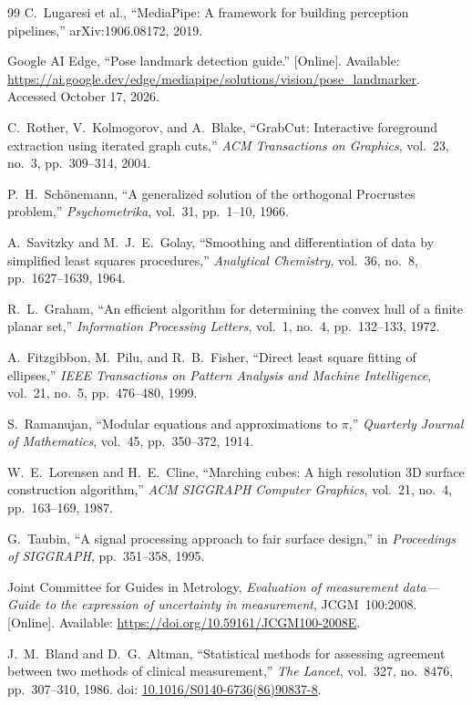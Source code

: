 \documentclass[11pt,a4paper]{article}
\begin{document}
\begin{thebibliography}{99}
C.~Lugaresi et al., ``MediaPipe: A framework for building perception pipelines,'' arXiv:1906.08172, 2019.

Google AI Edge, ``Pose landmark detection guide.'' [Online]. Available: \url{https://ai.google.dev/edge/mediapipe/solutions/vision/pose_landmarker}. Accessed October 17, 2026.

C.~Rother, V.~Kolmogorov, and A.~Blake, ``GrabCut: Interactive foreground extraction using iterated graph cuts,'' \emph{ACM Transactions on Graphics}, vol.~23, no.~3, pp.~309--314, 2004.

P.~H.~Sch\"onemann, ``A generalized solution of the orthogonal Procrustes problem,'' \emph{Psychometrika}, vol.~31, pp.~1--10, 1966.

A.~Savitzky and M.~J.~E.~Golay, ``Smoothing and differentiation of data by simplified least squares procedures,'' \emph{Analytical Chemistry}, vol.~36, no.~8, pp.~1627--1639, 1964.

R.~L.~Graham, ``An efficient algorithm for determining the convex hull of a finite planar set,'' \emph{Information Processing Letters}, vol.~1, no.~4, pp.~132--133, 1972.

A.~Fitzgibbon, M.~Pilu, and R.~B.~Fisher, ``Direct least square fitting of ellipses,'' \emph{IEEE Transactions on Pattern Analysis and Machine Intelligence}, vol.~21, no.~5, pp.~476--480, 1999.

S.~Ramanujan, ``Modular equations and approximations to $\pi$,'' \emph{Quarterly Journal of Mathematics}, vol.~45, pp.~350--372, 1914.

W.~E.~Lorensen and H.~E.~Cline, ``Marching cubes: A high resolution 3D surface construction algorithm,'' \emph{ACM SIGGRAPH Computer Graphics}, vol.~21, no.~4, pp.~163--169, 1987.

G.~Taubin, ``A signal processing approach to fair surface design,'' in \emph{Proceedings of SIGGRAPH}, pp.~351--358, 1995.

Joint Committee for Guides in Metrology, \emph{Evaluation of measurement data---Guide to the expression of uncertainty in measurement}, JCGM~100:2008. [Online]. Available: \url{https://doi.org/10.59161/JCGM100-2008E}.

J.~M.~Bland and D.~G.~Altman, ``Statistical methods for assessing agreement between two methods of clinical measurement,'' \emph{The Lancet}, vol.~327, no.~8476, pp.~307--310, 1986. doi: \href{https://doi.org/10.1016/S0140-6736(86)90837-8}{10.1016/S0140-6736(86)90837-8}.
\end{thebibliography}
\end{document}
